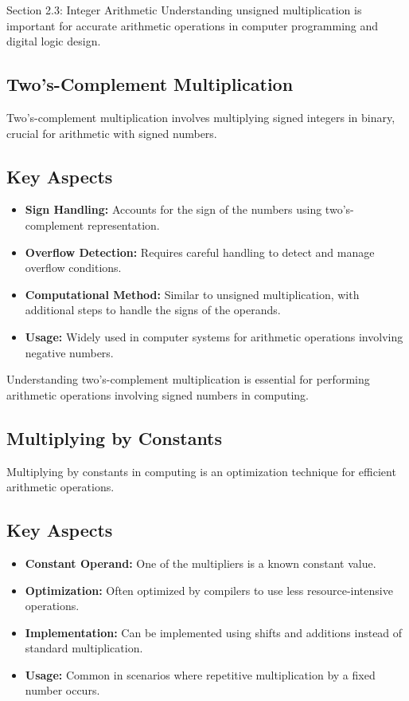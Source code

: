 \begin{notes}{Section 2.3: Integer Arithmetic}
    Understanding unsigned multiplication is important for accurate arithmetic operations in computer programming and digital logic design.

    \subsection*{Two's-Complement Multiplication}

    Two's-complement multiplication involves multiplying signed integers in binary, crucial for arithmetic with signed numbers.

    \subsection*{Key Aspects}
    
    \begin{itemize}
        \item \textbf{Sign Handling:} Accounts for the sign of the numbers using two's-complement representation.
        \item \textbf{Overflow Detection:} Requires careful handling to detect and manage overflow conditions.
        \item \textbf{Computational Method:} Similar to unsigned multiplication, with additional steps to handle the signs of the operands.
        \item \textbf{Usage:} Widely used in computer systems for arithmetic operations involving negative numbers.
    \end{itemize}
    
    Understanding two's-complement multiplication is essential for performing arithmetic operations involving signed numbers in computing.

    \subsection*{Multiplying by Constants}

    Multiplying by constants in computing is an optimization technique for efficient arithmetic operations.

    \subsection*{Key Aspects}
    
    \begin{itemize}
        \item \textbf{Constant Operand:} One of the multipliers is a known constant value.
        \item \textbf{Optimization:} Often optimized by compilers to use less resource-intensive operations.
        \item \textbf{Implementation:} Can be implemented using shifts and additions instead of standard multiplication.
        \item \textbf{Usage:} Common in scenarios where repetitive multiplication by a fixed number occurs.
    \end{itemize}
    

\end{notes}
